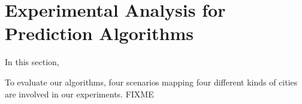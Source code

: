 \section{Experimental Analysis for Prediction Algorithms}
\label{sec:experiment_design}
In this section, 

To evaluate our algorithms, four scenarios mapping four different kinds of cities are involved in our experiments. FIXME 

















